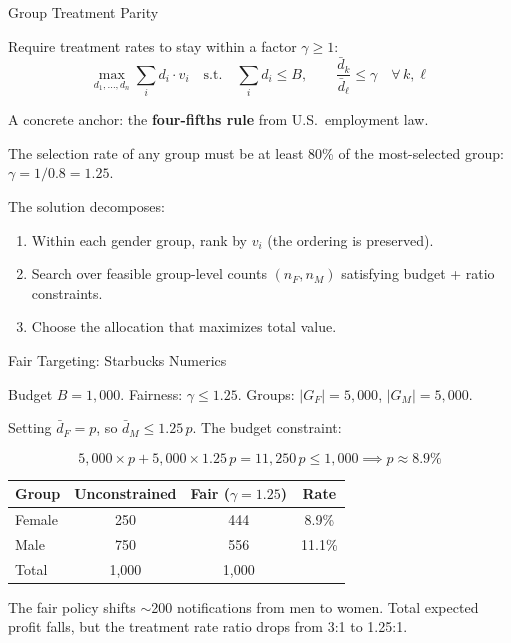 \documentclass[aspectratio=169, 11pt, handout]{beamer}
\begin{document}
 
\begin{frame}{Group Treatment Parity}
 
Require treatment rates to stay within a factor $\gamma \geq 1$:
\[
\max_{d_1, \ldots, d_n} \sum_{i} d_i \cdot v_i \quad \text{s.t.} \quad \sum_i d_i \leq B, \qquad \frac{\bar{d}_k}{\bar{d}_\ell} \leq \gamma \quad \forall\, k, \ell
\]
 
\pause
\bigskip
 
A concrete anchor: the \textbf{four-fifths rule} from U.S.\ employment law.
 
\medskip
 
The selection rate of any group must be at least 80\% of the most-selected group:
$\gamma = 1/0.8 = 1.25$.
 
\pause
\bigskip
 
The solution decomposes:
\begin{enumerate}
    \item Within each gender group, rank by $v_i$ (the ordering is preserved).
    \item Search over feasible group-level counts $(n_F, n_M)$ satisfying budget + ratio constraints.
    \item Choose the allocation that maximizes total value.
\end{enumerate}
 
\end{frame}
 
 
\begin{frame}{Fair Targeting: Starbucks Numerics}
 
Budget $B = 1{,}000$. Fairness: $\gamma \leq 1.25$. Groups: $|G_F| = 5{,}000$, $|G_M| = 5{,}000$.
 
\bigskip
 
Setting $\bar{d}_F = p$, so $\bar{d}_M \leq 1.25\,p$. The budget constraint:
 
\[
5{,}000 \times p + 5{,}000 \times 1.25\,p = 11{,}250\,p \leq 1{,}000 \implies p \approx 8.9\%
\]
 
\pause
\bigskip
 
\begin{center}
\begin{tabular}{lccc}
\toprule
\textbf{Group} & \textbf{Unconstrained} & \textbf{Fair ($\gamma = 1.25$)} & \textbf{Rate} \\
\midrule
Female & 250 & 444 & 8.9\% \\
Male & 750 & 556 & 11.1\% \\
\midrule
Total & 1,000 & 1,000 & \\
\bottomrule
\end{tabular}
\end{center}
 
\pause
\bigskip
 
The fair policy shifts $\sim$200 notifications from men to women. Total expected profit falls, but the treatment rate ratio drops from 3:1 to 1.25:1.
 
\end{frame}
 
\end{document}
